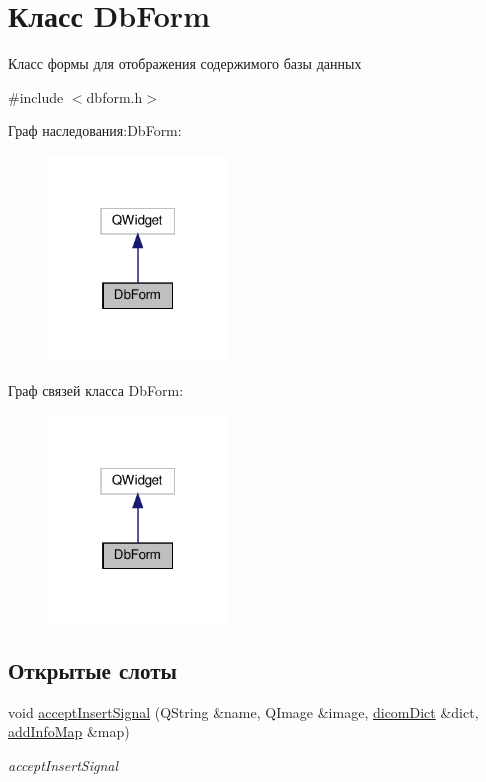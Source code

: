 \hypertarget{classDbForm}{}\section{Класс Db\+Form}
\label{classDbForm}


Класс формы для отображения содержимого базы данных  




{\ttfamily \#include $<$dbform.\+h$>$}



Граф наследования\+:Db\+Form\+:\nopagebreak
\begin{figure}[H]
\begin{center}
\leavevmode
\includegraphics[width=135pt]{classDbForm__inherit__graph}
\end{center}
\end{figure}


Граф связей класса Db\+Form\+:\nopagebreak
\begin{figure}[H]
\begin{center}
\leavevmode
\includegraphics[width=135pt]{classDbForm__coll__graph}
\end{center}
\end{figure}
\subsection*{Открытые слоты}
\begin{DoxyCompactItemize}
\item 
void \hyperlink{classDbForm_af542d8df492aab988ff036022365f3fd}{accept\+Insert\+Signal} (Q\+String \&name, Q\+Image \&image, \hyperlink{tagshelpers_8h_ae25d30658f61420b88a380dc9e40bb74}{dicom\+Dict} \&dict, \hyperlink{dbform_8h_a1ec1a645f41e1c6544d384ca863a936c}{add\+Info\+Map} \&map)
\begin{DoxyCompactList}\small\item\em accept\+Insert\+Signal \end{DoxyCompactList}\end{DoxyCompactItemize}
